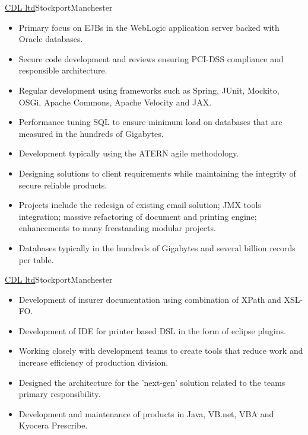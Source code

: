 \documentclass[a4paper,10pt]{moderncv}
\newcommand\weblink[2] {{\color{href} \href{#1}{#2}}}
\begin{document}
{\weblink{http://www.cdl.co.uk}{CDL ltd}}{Stockport}{Manchester}{
\begin{itemize}
  \item Primary focus on EJBs in the WebLogic application server backed with Oracle databases.
  \item Secure code development and reviews ensuring PCI-DSS compliance and responsible architecture.
  \item Regular development using frameworks such as Spring, JUnit, Mockito, OSGi, Apache Commons, Apache Velocity and JAX.
  \item Performance tuning SQL to ensure minimum load on databases that are measured in the hundreds of Gigabytes.
  \item Development typically using the ATERN agile methodology.
  \item Designing solutions to client requirements while maintaining the integrity of secure reliable products.
  \item Projects include the redesign of existing email solution; JMX tools integration; massive refactoring of document and printing engine; enhancements to many freestanding modular projects.
  \item Databases typically in the hundreds of Gigabytes and several billion records per table.
\end{itemize}
}

{\weblink{http://www.cdl.co.uk}{CDL ltd}}{Stockport}{Manchester}{
\begin{itemize}
  \item Development of insurer documentation using combination of XPath and XSL-FO.
  \item Development of IDE for printer based DSL in the form of eclipse plugins.
  \item Working closely with development teams to create tools that reduce work and increase efficiency of production division.
  \item Designed the architecture for the 'next-gen' solution related to the teams primary responsibility.
  \item Development and maintenance of products in Java, VB.net, VBA and Kyocera Prescribe.
\end{itemize}
}
\end{document}
